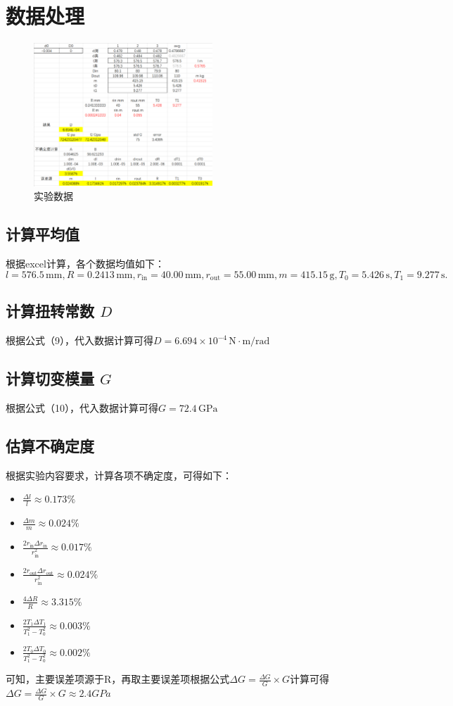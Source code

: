 \documentclass[12pt,a4paper]{article}
\begin{document}
	\section{数据处理}
		\begin{figure}[htbp]
			\centering
			\includegraphics[width=0.6\textwidth]{数据处理.png}
			\caption{实验数据}
			\label{fig:数据}
	  	\end{figure}
	  	\subsection{计算平均值}
		根据excel计算，各个数据均值如下：\\
		\[
		l = 576.5\,\mathrm{mm}, R = 0.2413\,\mathrm{mm}, r_{\text{in}} = 40.00\,\mathrm{mm}, r_{\text{out}} = 55.00\,\mathrm{mm}, m = 415.15\,\mathrm{g}, T_0 = 5.426\,\mathrm{s}, T_1 = 9.277\,\mathrm{s}.
		\]
		\subsection{计算扭转常数 $D$}
		根据公式（9），代入数据计算可得$D = 6.694 \times 10^{-4}\,\mathrm{N\cdot m/rad}$
		\subsection{计算切变模量 $G$}
		根据公式（10），代入数据计算可得$G = 72.4\,\mathrm{GPa}$
	  	\subsection{估算不确定度}
			根据实验内容要求，计算各项不确定度，可得如下：
			\begin{itemize}
				\item $\frac{\Delta l}{l} \approx 0.173\% $
				\item $\frac{\Delta m}{m} \approx 0.024\% $
				\item $\frac{2r_{\text{in}}\Delta r_{\text{in}}}{r_{\text{in}}^2} \approx 0.017\%$
				\item $\frac{2r_{\text{out}}\Delta r_{\text{out}}}{r_{\text{in}}^2} \approx 0.024\%$
				\item $\frac{4\Delta R}{R} \approx 3.315\%$
				\item $\frac{2T_1\Delta T_1}{T_1^2-T_0^2} \approx 0.003\%$
				\item $\frac{2T_0\Delta T_0}{T_1^2-T_0^2} \approx 0.002\%$
			\end{itemize}
			可知，主要误差项源于R，再取主要误差项根据公式$\Delta G = \frac{\Delta G}{G} \times G$计算可得
			$\Delta G = \frac{\Delta G}{G} \times G \approx 2.4GPa$
\end{document}
